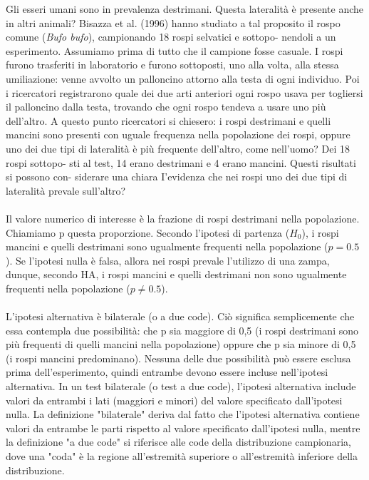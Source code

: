 \documentclass[10pt, draft]{book}
\newcounter{example}[section]
\begin{document}
\begin{example}\label{eslateralita}
    Gli esseri umani sono in prevalenza destrimani. Questa lateralità è presente anche in altri animali? Bisazza et al. (1996) hanno studiato a tal proposito il rospo comune (\textit{Bufo bufo}), campionando 18 rospi selvatici e sottopo- nendoli a un esperimento. Assumiamo prima di tutto che il campione fosse casuale. I rospi furono trasferiti in laboratorio e furono sottoposti, uno alla volta, alla stessa umiliazione: venne avvolto un palloncino attorno alla testa di ogni individuo. Poi i ricercatori registrarono quale dei due arti anteriori ogni rospo usava per togliersi il palloncino dalla testa, trovando che ogni rospo tendeva a usare uno più dell'altro. A questo punto ricercatori si chiesero: i rospi destrimani e quelli mancini sono presenti con uguale frequenza nella popolazione dei rospi, oppure uno dei due tipi di lateralità è più frequente dell'altro, come nell'uomo? Dei 18 rospi sottopo- sti al test, 14 erano destrimani e 4 erano mancini. Questi risultati si possono con- siderare una chiara I'evidenza che nei rospi uno dei due tipi di lateralità prevale sull'altro?
    \\
    \\
    Il valore numerico di interesse è la frazione di rospi destrimani nella popolazione. Chiamiamo p questa proporzione. Secondo l'ipotesi di partenza ($H_0$), i rospi mancini e quelli destrimani sono ugualmente frequenti nella popolazione ($p=0.5$). 
    Se l'ipotesi nulla è falsa, allora nei rospi prevale l'utilizzo di una zampa, dunque, secondo HA, i rospi mancini e quelli destrimani non sono ugualmente frequenti nella popolazione ($p \neq 0.5$).
    \\
    \\
    L'ipotesi alternativa è bilaterale (o a due code). Ciò significa semplicemente che essa contempla due possibilità: che p sia maggiore di 0,5 (i rospi destrimani sono più frequenti di quelli mancini nella popolazione) oppure che p sia minore di 0,5 (i rospi mancini predominano). Nessuna delle due possibilità può essere esclusa prima dell'esperimento, quindi entrambe devono essere incluse nell'ipotesi alternativa. In un test bilaterale (o test a due code), l'ipotesi alternativa include valori da entrambi i lati (maggiori e minori) del valore specificato dall'ipotesi nulla. La definizione "bilaterale" deriva dal fatto che l'ipotesi alternativa contiene valori da entrambe le parti rispetto al valore specificato dall'ipotesi nulla, mentre la definizione "a due code" si riferisce alle code della distribuzione campionaria, dove una "coda" è la regione all'estremità superiore o all'estremità inferiore della distribuzione. 
\end{example}
\end{document}
